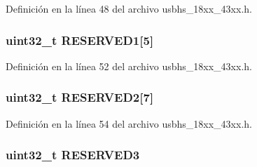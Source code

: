 Definición en la línea 48 del archivo usbhs\+\_\+18xx\+\_\+43xx.\+h.

\subsubsection[{\texorpdfstring{R\+E\+S\+E\+R\+V\+E\+D1}{RESERVED1}}]{ uint32\+\_\+t R\+E\+S\+E\+R\+V\+E\+D1\mbox{[}5\mbox{]}}\hypertarget{struct_l_p_c___u_s_b_h_s___t_a00aaa32c956f5b42a9a5978efc85bdcd}{}\label{struct_l_p_c___u_s_b_h_s___t_a00aaa32c956f5b42a9a5978efc85bdcd}


Definición en la línea 52 del archivo usbhs\+\_\+18xx\+\_\+43xx.\+h.

\subsubsection[{\texorpdfstring{R\+E\+S\+E\+R\+V\+E\+D2}{RESERVED2}}]{ uint32\+\_\+t R\+E\+S\+E\+R\+V\+E\+D2\mbox{[}7\mbox{]}}\hypertarget{struct_l_p_c___u_s_b_h_s___t_a8fa48cb2c9267b161766a3a5d2591e29}{}\label{struct_l_p_c___u_s_b_h_s___t_a8fa48cb2c9267b161766a3a5d2591e29}


Definición en la línea 54 del archivo usbhs\+\_\+18xx\+\_\+43xx.\+h.

\subsubsection[{\texorpdfstring{R\+E\+S\+E\+R\+V\+E\+D3}{RESERVED3}}]{ uint32\+\_\+t R\+E\+S\+E\+R\+V\+E\+D3}\hypertarget{struct_l_p_c___u_s_b_h_s___t_a0dccf23b0301eb78ab61f90a3e6ae594}{}\label{struct_l_p_c___u_s_b_h_s___t_a0dccf23b0301eb78ab61f90a3e6ae594}


